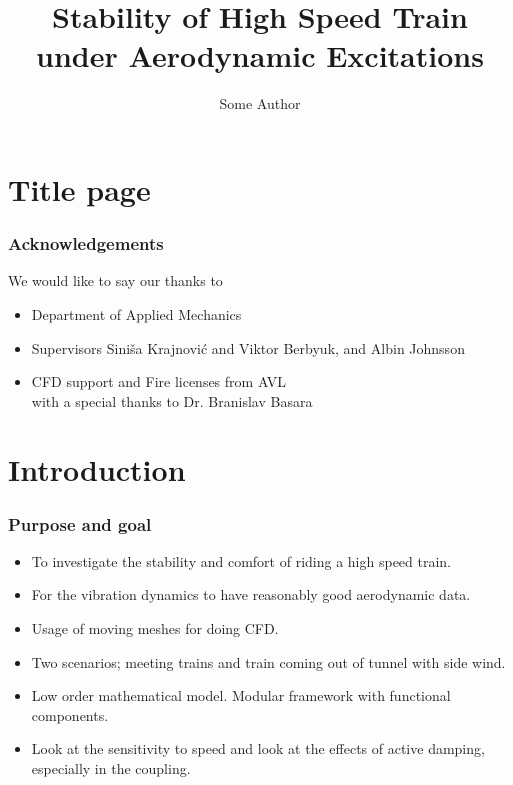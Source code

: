 \documentclass[12pt]{beamer}
\title{Stability of High Speed Train under Aerodynamic Excitations}
\author{Some Author}
\institute{Chalmers University of Technology}
\begin{document}
\section{Title page} %
\begin{frame}[plain]
 \titlepage
\end{frame}

\begin{frame}
 \frametitle{Acknowledgements}
 We would like to say our thanks to
\begin{itemize}
 \item Department of Applied Mechanics
 \item Supervisors Sini\v{s}a Krajnovi\'{c} and Viktor Berbyuk, and Albin Johnsson
 \item CFD support and Fire licenses from AVL\\ with a special thanks to Dr. Branislav Basara
\end{itemize}
\end{frame}

\section{Introduction}
\begin{frame}
 \frametitle{Purpose and goal}
 \begin{itemize}
  \item To investigate the stability and comfort of riding a high speed train.
  \item For the vibration dynamics to have reasonably good aerodynamic data.
  \item Usage of moving meshes for doing CFD.
  \item Two scenarios; meeting trains and train coming out of tunnel with side wind.
  \item Low order mathematical model. Modular framework with functional components.
  \item Look at the sensitivity to speed and look at the effects of active damping, especially in the coupling.
 \end{itemize}
\end{frame}
\end{document}
